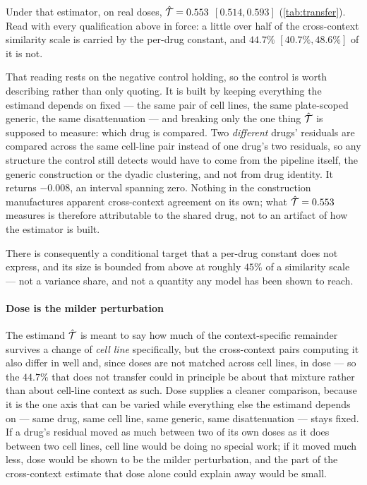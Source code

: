 Under that estimator, on real doses, $\hat{\mathcal{T}} = 0.553$ $[0.514, 0.593]$
(\cref{tab:transfer}). Read with every qualification above in force: a little over
half of the cross-context similarity scale is carried by the per-drug constant,
and $44.7\%$ $[40.7\%, 48.6\%]$ of it is not.

That reading rests on the negative control holding, so the control is worth
describing rather than only quoting. It is built by keeping everything the
estimand depends on fixed --- the same pair of cell lines, the same plate-scoped
generic, the same disattenuation --- and breaking only the one thing $\hat{\mathcal{T}}$
is supposed to measure: which drug is compared. Two \emph{different} drugs' residuals
are compared across the same cell-line pair instead of one drug's two residuals,
so any structure the control still detects would have to come from the pipeline
itself, the generic construction or the dyadic clustering, and not from drug
identity. It returns $-0.008$, an interval spanning zero. Nothing in the
construction manufactures apparent cross-context agreement on its own; what
$\hat{\mathcal{T}} = 0.553$ measures is therefore attributable to the shared drug, not
to an artifact of how the estimator is built.

There is consequently a conditional target that a per-drug constant does not
express, and its size is bounded from above at roughly $45\%$ of a similarity
scale --- not a variance share, and not a quantity any model has been shown to
reach.

\paragraph{Dose is the milder perturbation} The estimand $\hat{\mathcal{T}}$ is meant
to say how much of the context-specific remainder survives a change of
\emph{cell line} specifically, but the cross-context pairs computing it also
differ in well and, since doses are not matched across cell lines, in dose ---
so the $44.7\%$ that does not transfer could in principle be about that mixture
rather than about cell-line context as such. Dose supplies a cleaner comparison,
because it is the one axis that can be varied while everything else the
estimand depends on --- same drug, same cell line, same generic, same
disattenuation --- stays fixed. If a drug's residual moved as much between two
of its own doses as it does between two cell lines, cell line would be doing no
special work; if it moved much less, dose would be shown to be the milder
perturbation, and the part of the cross-context estimate that dose alone could
explain away would be small.

